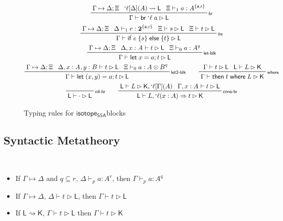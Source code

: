 \documentclass[acmsmall,screen,review]{acmart}
\newcommand{\mb}[1]{\ensuremath{\mathbf{#1}}}
\newcommand{\ms}[1]{\ensuremath{\mathsf{#1}}}
\newcommand{\lbl}[1]{{`#1}}
\newcommand{\lto}{\Rightarrow}
\newcommand{\letstmt}[3]{\ensuremath{\ms{let}\;#1 = #2; #3}}
\newcommand{\brb}[2]{\ms{br}\;#1\;#2}
\newcommand{\lbrb}[2]{\brb{\lbl{#1}}{#2}}
\newcommand{\ite}[3]{\ms{if}\;#1\;\{#2\}\;\ms{else}\;\{#3\}}
\newcommand{\ewhere}[2]{\ms{then}\;#1\;\ms{where}\;#2}
\newcommand{\wbranch}[3]{#1(#2) \lto #3}
\newcommand{\lwbranch}[3]{\wbranch{\lbl{#1}}{#2}{#3}}
\newcommand{\csplits}[3]{#1 \mapsto #2;#3}
\newcommand{\cwk}[2]{#1 \mapsto #2}
\newcommand{\lwk}[2]{#1 \rightsquigarrow #2}
\newcommand{\thyp}[3]{#1: {#2}^{#3}}
\newcommand{\lhyp}[3]{#1[#2](#3)}
\newcommand{\llhyp}[3]{\lhyp{\lbl{#1}}{#2}{#3}}
\newcommand{\rle}[1]{{\scriptsize\textsf{#1}}}
\newcommand{\tint}{{\{\ms{a}, \ms{r}\}}}
\newcommand{\hasty}[5]{#1 \vdash_{#2} #3: {#4}^{#5}}
\newcommand{\haslb}[3]{#1 \vdash #2 \rhd #3}
\newcommand{\lhaslb}[3]{#1 \vdash #2 \rhd #3}
\newcommand{\isotopessa}{\ms{isotope_{SSA}}}
\begin{document}
\begin{figure}
  \begin{gather*}    
    \prftree[r]{\rle{br}}
      {\csplits{\Gamma}{\Delta}{\Xi}}
      {\lwk{\llhyp{\ell}{\Delta}{A}}{\ms{L}}}
      {\hasty{\Xi}{1}{a}{A}{\tint}}
      {\haslb{\Gamma}{\lbrb{\ell}{a}}{\ms{L}}} 
    \\
    \prftree[r]{\rle{ite}}
      {\csplits{\Gamma}{\Delta}{\Xi}}
      {\hasty{\Delta}{1}{e}{\mb{2}}{\tint}}
      {\haslb{\Xi}{s}{\ms{L}}}
      {\haslb{\Xi}{t}{\ms{L}}}
      {\haslb{\Gamma}{\ite{e}{s}{t}}{\ms{L}}} 
    \\
    \prftree[r]{\rle{let-blk}}
      {\csplits{\Gamma}{\Delta}{\Xi}}
      {\haslb{\Delta, \thyp{x}{A}{}}{t}{\ms{L}}}
      {\hasty{\Xi}{0}{a}{A}{q}}
      {\haslb{\Gamma}{\letstmt{x}{a}{t}}{\ms{L}}} 
    \\
    \prftree[r]{\rle{let2-blk}}
      {\csplits{\Gamma}{\Delta}{\Xi}}
      {\haslb{\Delta, \thyp{x}{A}{}, \thyp{y}{B}{}}{t}{\ms{L}}}
      {\hasty{\Xi}{0}{a}{A \otimes B}{q}}
      {\haslb{\Gamma}{\letstmt{(x, y)}{a}{t}}{\ms{L}}} \qquad
    \prftree[r]{\rle{where}}
      {\haslb{\Gamma}{t}{\ms{L}}}
      {\lhaslb{\ms{L}}{L}{\ms{K}}}
      {\haslb{\Gamma}{\ewhere{t}{L}}{\ms{K}}}
    \\
    \prftree[r]{\rle{nil-br}}
      {\lhaslb{\ms{L}}{\cdot}{\ms{L}}} \qquad
    \prftree[r]{\rle{cons-br}}
      {\lhaslb{\ms{L}}{L}{\ms{K}, \llhyp{\ell}{\Gamma}{A}}}
      {\haslb{\Gamma, \thyp{x}{A}{}}{t}{\ms{L}}}
      {\lhaslb{\ms{L}}{L, \lwbranch{\ell}{x: A}{t}}{\ms{K}}}
  \end{gather*}
  \caption{Typing rules for \isotopessa blocks}
  \label{fig:ssa-block-typing}
\end{figure}

\subsection{Syntactic Metatheory}

\begin{theorem}[Weakening] \
  \begin{itemize}
    \item If \(\cwk{\Gamma}{\Delta}\) and \(q \subseteq r\), \(\hasty{\Delta}{p}{a}{A}{r}\), then \(\hasty{\Gamma}{p}{a}{A}{q}\)
    \item If \(\cwk{\Gamma}{\Delta}\), \(\haslb{\Delta}{t}{\ms{L}}\), then \(\haslb{\Gamma}{t}{\ms{L}}\)
    \item If \(\lwk{\ms{L}}{\ms{K}}\), \(\haslb{\Gamma}{t}{\ms{L}}\) then \(\haslb{\Gamma}{t}{\ms{K}}\)
  \end{itemize}
\end{theorem}
\end{document}
